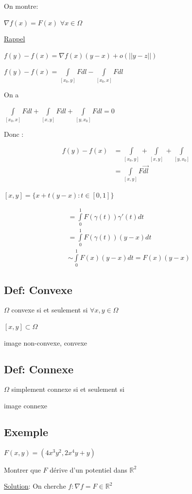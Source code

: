\documentclass[11pt]{article}
\begin{document}
On montre:

\(\nabla f(x) = F(x)\) \(\forall x \in \Omega\)

\uline{Rappel}

\(f(y) - f(x) = \nabla f(x)(y-x)+o(||y-z||)\)

\(f(y) - f(x) = \int\limits_{[x_0,y]} F dl - \int\limits_{[x_0,x]} F dl\)

On a

\(\int\limits_{[x_0,x]} F dl + \int\limits_{[x,y]} F dl + \int\limits_{[y,x_0]} F
dl = 0\)

Donc :

\begin{align*}
f(y) -f(x) &= \int\limits_{[x_0,y]} + \int\limits_{[x,y]} + \int\limits_{[y,x_0]}\\
&= \int\limits_{[x,y]} F \vec{dl}
\end{align*}

\([x,y] = \lbrace x+ t(y-x): t\in [0,1] \rbrace\)

\begin{align*}
&= \int\limits_0^1 F(\gamma(t)) \gamma'(t) dt\\
&= \int\limits_0^1 F(\gamma(t)) (y-x) dt\\
&\sim \int\limits_0^1 F(x) (y-x) dt = F(x) (y-x)
\end{align*}

\subsection{Def: Convexe}
\label{sec:orgheadline36}
\(\Omega\) convexe si et seulement si \(\forall x,y \in \Omega\)

\([x,y] \subset \Omega\)

image non-convexe, convexe

\subsection{Def: Connexe}
\label{sec:orgheadline37}
\(\Omega\) simplement connexe si et seulement si

image connexe 

\subsection{Exemple}
\label{sec:orgheadline38}
\(F(x,y) = (4 x^3 y^2, 2x^4y + y)\)

Montrer que \(F\) dérive d'un potentiel dans \(\mathbb{R}^2\)

\uline{Solution}: On cherche \(f: \nabla f = F \in \mathbb{R}^2\)
\end{document}
